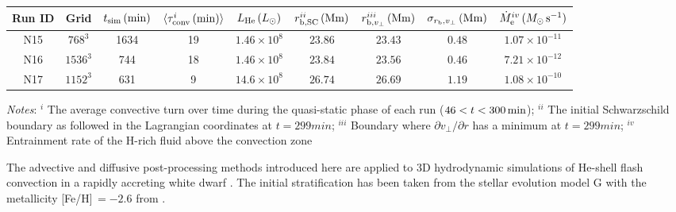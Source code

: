 \documentclass[fleqn,usenatbib]{mnras}
\newcommand{\cldfluid}{fluid above the convection zone}
\newcommand{\ppmstar}{\code{PPMstar}}
\begin{document}
\begin{table*}
	\centering
	\caption{Summary of the \ppmstar{} simulations that were computed for this
          work. The entrainment rates are the slopes of the linear fits shown in
          , while the different definitions of the convective boundary are
          discussed in detail in .}
	\label{tab:ppmstarmodels}
  \begin{threeparttable}
	\begin{tabular}{ccccccccc} %
		\toprule
		Run ID & Grid & $t_{\mathrm{sim}} \, (\mathrm{min})$ & $\langle \tau_{\mathrm{conv}}^{i} \, (\mathrm{min}) \rangle$ & $L_{\mathrm{He}} \, (L_{\odot})$ & $r_{\mathrm{b}, \mathrm{SC}}^{ii} \, (\mathrm{Mm})$ & $r_{\mathrm{b}, v_{\perp}}^{iii} \, (\mathrm{Mm})$ & $\sigma_{r_{\mathrm{b}}, v_{\perp}} \, (\mathrm{Mm})$ & $\dot{M}_{\mathrm{e}}^{iv} \, (M_{\odot} \, \mathrm{s}^{-1})$\\
		\midrule
		N15 & $768^{3}$ & 1634 & 19 & $1.46 \times 10^{8}$ & $23.86$ & $23.43$ & $0.48$ & $1.07 \times 10^{-11}$  \\
		N16 & $1536^{3}$ & 744 & 18 & $1.46 \times 10^{8}$ & $23.84$ & $23.56$ & $0.46$ & $7.21 \times 10^{-12}$  \\
		N17 & $1152^{3}$ & 631 & 9 & $14.6 \times 10^{8}$ & $26.74$ & $26.69$ & $1.19$ & $1.08 \times 10^{-10}$  \\
		\bottomrule
	\end{tabular}
  \begin{tablenotes}
    \small
  \item \textit{Notes}: $^{i}$ The average convective turn over time during the
    quasi-static phase of each run ($46 < t < 300 \, \mathrm{min}$); $^{ii}$ The
    initial Schwarzschild boundary as followed in the Lagrangian
    coordinates at $t = \unit{299}{min}$; $^{iii}$ Boundary where $\partial v_{\perp} / \partial r$ has a
    minimum at $t = \unit{299}{min}$; $^{iv}$ Entrainment rate of the H-rich 
    \cldfluid{} 
  \end{tablenotes}
  \end{threeparttable}                
  
\end{table*}

The advective and diffusive post-processing methods introduced here are applied
to 3D hydrodynamic simulations of He-shell flash convection in a rapidly
accreting white dwarf \citep{Denissenkov:2017ba}. The initial stratification has
been taken from the stellar evolution model G with the metallicity [Fe/H]\,$= -2.6$
from \cite{Denissenkov:19}.
\end{document}
